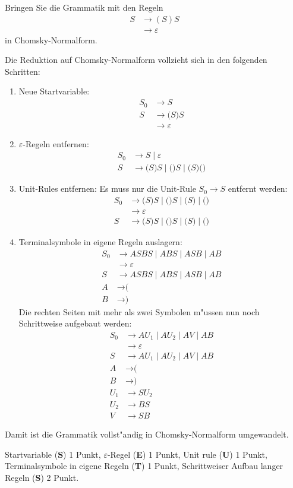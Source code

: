 Bringen Sie die Grammatik mit den Regeln
\begin{align*}
S&\rightarrow (S)S
\\
 &\rightarrow \varepsilon
\end{align*}
in Chomsky-Normalform.

\begin{loesung}
Die Reduktion auf Chomsky-Normalform vollzieht sich in den folgenden Schritten:
\begin{enumerate}
\item
Neue Startvariable:
\begin{align*}
S_0&\rightarrow S
\\
S&\rightarrow \texttt{(}S\texttt{)}S
\\
 &\rightarrow \varepsilon
\end{align*}
\item
$\varepsilon$-Regeln entfernen:
\begin{align*}
S_0&\rightarrow S \;|\; \varepsilon
\\
S&\rightarrow \texttt{(}S\texttt{)}S \;|\; \texttt{(}\texttt{)}S \;|\;
  \texttt{(}S\texttt{)} \texttt{(}\texttt{)}
\end{align*}
\item
Unit-Rules entfernen: Es muss nur die Unit-Rule $S_0\to S$ entfernt
werden:
\begin{align*}
S_0& \rightarrow \texttt{(}S)S \;|\; \texttt{(})S \;|\; \texttt{(}S) \;|\;
	\texttt{(})
\\
   &\rightarrow \varepsilon
\\
S&\rightarrow \texttt{(}S\texttt{)}S \;|\; \texttt{(}\texttt{)}S \;|\;
	\texttt{(}S\texttt{)} \;|\; \texttt{(}\texttt{)}
\end{align*}
\item Terminalsymbole in eigene Regeln auslagern:
\begin{align*}
S_0& \rightarrow ASBS \;|\; ABS \;|\; ASB \;|\; AB
\\
   &\rightarrow \varepsilon
\\
S&\rightarrow ASBS \;|\; ABS \;|\; ASB \;|\; AB
\\
A&\rightarrow \texttt{(}
\\
B&\rightarrow \texttt{)}
\end{align*}
Die rechten Seiten mit mehr als zwei Symbolen m"ussen nun noch Schrittweise
aufgebaut werden:
\begin{align*}
S_0& \rightarrow AU_1 \;|\; AU_2 \;|\; AV \;|\; AB
\\
   &\rightarrow \varepsilon
\\
S&\rightarrow AU_1 \;|\; AU_2 \;|\; AV \;|\; AB
\\
A&\rightarrow \texttt{(}
\\
B&\rightarrow \texttt{)}
\\
U_1&\rightarrow SU_2\\
U_2&\rightarrow BS\\
V  &\rightarrow SB
\end{align*}
\end{enumerate}
Damit ist die Grammatik vollst"andig in Chomsky-Normalform umgewandelt.
\end{loesung}

\begin{bewertung}
Startvariable ({\bf S}) 1 Punkt,
$\varepsilon$-Regel ({\bf E}) 1 Punkt,
Unit rule ({\bf U}) 1 Punkt,
Terminalsymbole in eigene Regeln ({\bf T}) 1 Punkt,
Schrittweiser Aufbau langer Regeln ({\bf S}) 2 Punkt.
\end{bewertung}

